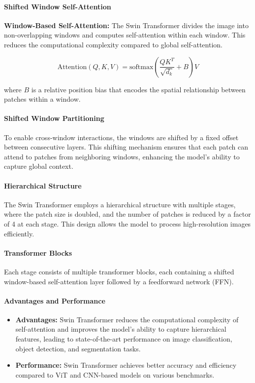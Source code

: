 \documentclass[12pt]{article}
\begin{document}
\paragraph{Shifted Window Self-Attention}

\textbf{Window-Based Self-Attention:} The Swin Transformer divides the image into non-overlapping windows and computes self-attention within each window. This reduces the computational complexity compared to global self-attention.

\[
\text{Attention}(Q, K, V) = \text{softmax} \left( \frac{QK^T}{\sqrt{d_k}} + B \right) V
\]

where \(B\) is a relative position bias that encodes the spatial relationship between patches within a window.

\paragraph{Shifted Window Partitioning}

To enable cross-window interactions, the windows are shifted by a fixed offset between consecutive layers. This shifting mechanism ensures that each patch can attend to patches from neighboring windows, enhancing the model's ability to capture global context.

\paragraph{Hierarchical Structure}

The Swin Transformer employs a hierarchical structure with multiple stages, where the patch size is doubled, and the number of patches is reduced by a factor of 4 at each stage. This design allows the model to process high-resolution images efficiently.

\paragraph{Transformer Blocks}

Each stage consists of multiple transformer blocks, each containing a shifted window-based self-attention layer followed by a feedforward network (FFN).

\paragraph{Advantages and Performance}

\begin{itemize}
    \item \textbf{Advantages:} Swin Transformer reduces the computational complexity of self-attention and improves the model's ability to capture hierarchical features, leading to state-of-the-art performance on image classification, object detection, and segmentation tasks.
    \item \textbf{Performance:} Swin Transformer achieves better accuracy and efficiency compared to ViT and CNN-based models on various benchmarks.
\end{itemize}
\end{document}
